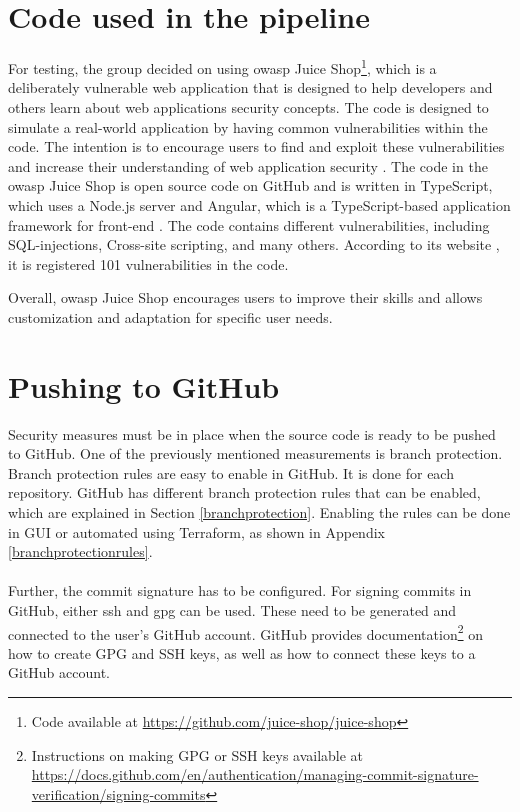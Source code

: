 \section{Code used in the pipeline}
For testing, the group decided on using \acrshort{owasp} Juice Shop\footnote{Code available at \url{https://github.com/juice-shop/juice-shop}}, which is a deliberately vulnerable web application that is designed to help developers and others learn about web applications security concepts. The code is designed to simulate a real-world application by having common vulnerabilities within the code. The intention is to encourage users to find and exploit these vulnerabilities and increase their understanding of web application security \cite{owaspJuiceShop}.
The code in the \acrshort{owasp} Juice Shop is open source code on GitHub and is written in TypeScript, which uses a Node.js server and Angular, which is a TypeScript-based application framework for \gls{front-end} \cite{owaspJuiceShopCode}. The code contains different vulnerabilities, including \gls{SQL-injection}s, \gls{Cross-site scripting}, and many others. According to its website \cite{owaspJuiceShop}, it is registered 101 vulnerabilities in the code.

Overall, \acrshort{owasp} Juice Shop encourages users to improve their skills and allows customization and adaptation for specific user needs.

 \newpage
\section{Pushing to GitHub}
Security measures must be in place when the source code is ready to be pushed to GitHub. One of the previously mentioned measurements is branch protection. Branch protection rules are easy to enable in GitHub. It is done for each repository. GitHub has different branch protection rules that can be enabled, which are explained in Section \ref{branchprotection}. Enabling the rules can be done in \gls{GUI} or automated using Terraform, as shown in Appendix \ref{branchprotectionrules}. 
\\~\\
Further, the commit signature has to be configured. For signing commits in GitHub, either \acrshort{ssh} and \acrshort{gpg} can be used. These need to be generated and connected to the user's GitHub account.
GitHub provides documentation\footnote{Instructions on making GPG or SSH keys available at \url{https://docs.github.com/en/authentication/managing-commit-signature-verification/signing-commits}} on how to create GPG and SSH keys, as well as how to connect these keys to a GitHub account.

